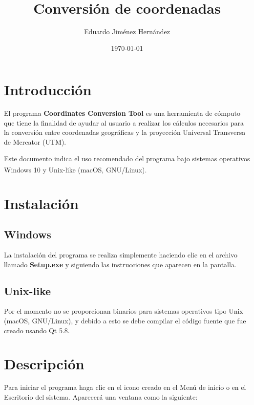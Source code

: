 \documentclass[12pt, letterpaper]{article}
\begin{document}
\title{Conversión de coordenadas}
\author{Eduardo Jiménez Hernández}
\date{\today}
\maketitle

\section{Introducción}

El programa \textbf{Coordinates Conversion Tool} es una herramienta de cómputo que tiene la finalidad de ayudar al usuario a realizar los cálculos necesarios para la conversión entre coordenadas geográficas y la proyección Universal Transversa de Mercator (UTM).

Este documento indica el uso recomendado del programa bajo sistemas operativos Windows 10\textsuperscript{\textregistered} y Unix-like (macOS, GNU/Linux).

\section{Instalación}

\subsection{Windows}

La instalación del programa se realiza simplemente haciendo clic en el archivo llamado \textbf{Setup.exe} y siguiendo las instrucciones que aparecen en la pantalla.

\subsection{Unix-like}

Por el momento no se proporcionan binarios para sistemas operativos tipo Unix (macOS, GNU/Linux), y debido a esto se debe compilar el código fuente que fue creado usando Qt 5.8.

\section{Descripción}

Para iniciar el programa haga clic en el icono creado en el Menú de inicio o en el Escritorio del sistema. Aparecerá una ventana como la siguiente:
\end{document}
